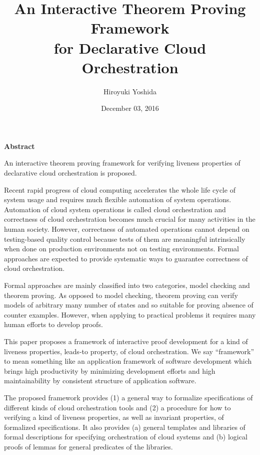 \documentclass[12pt]{report}
\title{An Interactive Theorem Proving Framework\\for Declarative Cloud Orchestration}
\author{Hiroyuki Yoshida}
\date{December 03, 2016}
\begin{document}
\maketitle
{}  %
\setcounter{page}{1}
\strut
\vspace{20pt}
\begin{center}
{\LARGE\bf Abstract}
\end{center}
\vspace{20pt}
An interactive theorem proving framework for verifying liveness
properties of declarative cloud orchestration is proposed.

Recent rapid progress of cloud computing accelerates the whole life
cycle of system usage and requires much flexible automation of system
operations. Automation of cloud system operations is called cloud
orchestration and correctness of cloud orchestration becomes much
crucial for many activities in the human society.  However,
correctness of automated operations cannot depend on testing-based
quality control because tests of them are meaningful intrinsically
when done on production environments not on testing environments.
Formal approaches are expected to provide systematic ways to guarantee
correctness of cloud orchestration.

Formal approaches are mainly classified into two categories, model
checking and theorem proving. As opposed to model checking, theorem
proving can verify models of arbitrary many number of states and so
suitable for proving absence of counter examples. However, when
applying to practical problems it requires many human efforts to
develop proofs.

This paper proposes a framework of interactive proof development for a
kind of liveness properties, leads-to property, of cloud
orchestration. We say ``framework'' to mean something like an
application framework of software development which brings high
productivity by minimizing development efforts and high
maintainability by consistent structure of application software.

The proposed framework provides (1) a general way to formalize
specifications of different kinds of cloud orchestration tools and (2)
a procedure for how to verifying a kind of liveness properties, as
well as invariant properties, of formalized specifications.  It also
provides (a) general templates and libraries of formal descriptions
for specifying orchestration of cloud systems and (b) logical proofs
of lemmas for general predicates of the libraries.
\end{document}
